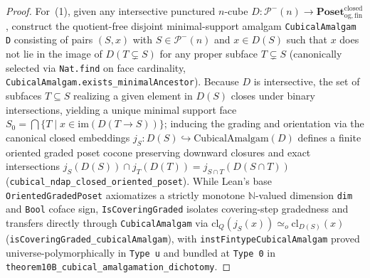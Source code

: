 \documentclass[10pt,twoside,openright]{book}
\theoremstyle{crmplain}
\theoremstyle{crmdef}
\theoremstyle{crmremark}
\begin{document}
\begin{proof}
For~(1), given any intersective punctured $n$-cube $D : \mathcal{P}^-(n) \to \mathbf{Poset}_{\mathrm{og,fin}}^{\mathrm{closed}}$, construct the quotient-free disjoint minimal-support amalgam \texttt{CubicalAmalgam D} consisting of pairs $(S, x)$ with $S \in \mathcal{P}^-(n)$ and $x \in D(S)$ such that $x$ does not lie in the image of $D(T \subsetneq S)$ for any proper subface $T \subsetneq S$ (canonically selected via \texttt{Nat.find} on face cardinality, \texttt{CubicalAmalgam.exists\_\allowbreak minimalAncestor}). Because $D$ is intersective, the set of subfaces $T \subseteq S$ realizing a given element in $D(S)$ closes under binary intersections, yielding a unique minimal support face $S_0 = \bigcap \{T \mid x \in \mathrm{im}(D(T \to S))\}$; inducing the grading and orientation via the canonical closed embeddings $j_S : D(S) \hookrightarrow \mathrm{CubicalAmalgam}(D)$ defines a finite oriented graded poset cocone preserving downward closures and exact intersections $j_S(D(S)) \cap j_T(D(T)) = j_{S \cap T}(D(S \cap T))$ (\texttt{cubical\_\allowbreak ndap\_\allowbreak closed\_\allowbreak oriented\_\allowbreak poset}). While Lean's base \texttt{OrientedGradedPoset} axiomatizes a strictly monotone $\mathbb{N}$-valued dimension \texttt{dim} and \texttt{Bool} coface sign, \texttt{IsCoveringGraded} isolates covering-step gradedness and transfers directly through \texttt{CubicalAmalgam} via $\mathrm{cl}_Q(j_S(x)) \simeq_o \mathrm{cl}_{D(S)}(x)$ (\texttt{isCoveringGraded\_\allowbreak cubicalAmalgam}), with \texttt{instFintypeCubicalAmalgam} proved universe-polymorphically in \texttt{Type~u} and bundled at \texttt{Type~0} in \texttt{theorem10B\_\allowbreak cubical\_\allowbreak amalgamation\_\allowbreak dichotomy}.


\end{proof}
\end{document}
